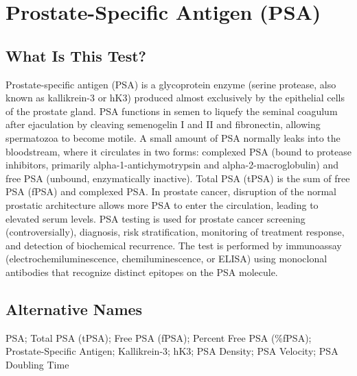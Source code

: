\chapter{Prostate-Specific Antigen (PSA)}

\section*{What Is This Test?}
Prostate-specific antigen (PSA) is a glycoprotein enzyme (serine protease, also known as kallikrein-3 or hK3) produced almost exclusively by the epithelial cells of the prostate gland. PSA functions in semen to liquefy the seminal coagulum after ejaculation by cleaving semenogelin I and II and fibronectin, allowing spermatozoa to become motile. A small amount of PSA normally leaks into the bloodstream, where it circulates in two forms: complexed PSA (bound to protease inhibitors, primarily alpha-1-antichymotrypsin and alpha-2-macroglobulin) and free PSA (unbound, enzymatically inactive). Total PSA (tPSA) is the sum of free PSA (fPSA) and complexed PSA. In prostate cancer, disruption of the normal prostatic architecture allows more PSA to enter the circulation, leading to elevated serum levels. PSA testing is used for prostate cancer screening (controversially), diagnosis, risk stratification, monitoring of treatment response, and detection of biochemical recurrence. The test is performed by immunoassay (electrochemiluminescence, chemiluminescence, or ELISA) using monoclonal antibodies that recognize distinct epitopes on the PSA molecule.

\section*{Alternative Names}
PSA; Total PSA (tPSA); Free PSA (fPSA); Percent Free PSA (\%fPSA); Prostate-Specific Antigen; Kallikrein-3; hK3; PSA Density; PSA Velocity; PSA Doubling Time


